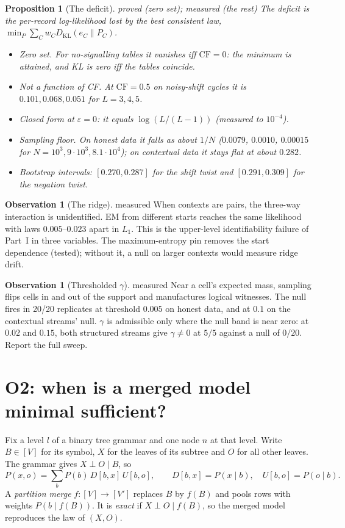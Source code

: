 \documentclass[11pt]{article}
\newtheorem{proposition}[theorem]{Proposition}
\theoremstyle{definition}
\newtheorem{observation}[theorem]{Observation}
\theoremstyle{remark}
\newcommand{\CF}{\mathrm{CF}}
\newcommand{\KL}{D_{\mathrm{KL}}}
\newcommand{\st}[1]{\textsf{\small\color{gray}#1}}
\begin{document}
\begin{proposition}[The deficit]\st{proved (zero set); measured (the rest)}
The \emph{deficit} is the per-record log-likelihood lost by the best consistent law, $\min_P\sum_C w_C\KL(e_C\|P_C)$.
\begin{itemize}
  \item \emph{Zero set.} For no-signalling tables it vanishes iff $\CF=0$: the minimum is attained, and KL is zero iff the tables coincide.
  \item \emph{Not a function of CF.} At $\CF=0.5$ on noisy-shift cycles it is $0.101,0.068,0.051$ for $L=3,4,5$.
  \item \emph{Closed form at $\varepsilon=0$:} it equals $\log(L/(L-1))$ (measured to $10^{-4}$).
  \item \emph{Sampling floor.} On honest data it falls as about $1/N$ ($0.0079$, $0.0010$, $0.00015$ for $N=10^3,9\cdot10^3,8.1\cdot10^4$); on contextual data it stays flat at about $0.282$.
  \item \emph{Bootstrap intervals:} $[0.270,0.287]$ for the shift twist and $[0.291,0.309]$ for the negation twist.
\end{itemize}
\end{proposition}
\begin{observation}[The ridge]\st{measured}
When contexts are pairs, the three-way interaction is unidentified. EM from different starts reaches the same likelihood with laws $0.005$--$0.023$ apart in $L_1$. This is the upper-level identifiability failure of Part~I in three variables. The maximum-entropy pin removes the start dependence (tested); without it, a null on larger contexts would measure ridge drift.
\end{observation}
\begin{observation}[Thresholded $\gamma$]\st{measured}
Near a cell's expected mass, sampling flips cells in and out of the support and manufactures logical witnesses. The null fires in 20/20 replicates at threshold $0.005$ on honest data, and at $0.1$ on the contextual streams' null. $\gamma$ is admissible only where the null band is near zero: at $0.02$ and $0.15$, both structured streams give $\gamma\ne0$ at $5/5$ against a null of $0/20$. Report the full sweep.
\end{observation}

\section{O2: when is a merged model minimal sufficient?}\label{sec:o2}
Fix a level $l$ of a binary tree grammar and one node $n$ at that level. Write $B\in[V]$ for its symbol, $X$ for the leaves of its subtree and $O$ for all other leaves. The grammar gives $X\perp O\mid B$, so
\[
P(x,o)=\sum_b P(b)\,D[b,x]\,U[b,o],\qquad D[b,x]=P(x\mid b),\quad U[b,o]=P(o\mid b).
\]
A \emph{partition merge} $f:[V]\to[V']$ replaces $B$ by $f(B)$ and pools rows with weights $P(b\mid f(B))$. It is \emph{exact} if $X\perp O\mid f(B)$, so the merged model reproduces the law of $(X,O)$.
\end{document}
